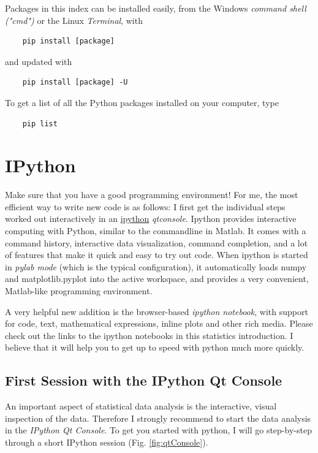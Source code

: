 Packages in this index can be installed easily, from the Windows \emph{command shell ("cmd")} or the Linux \emph{Terminal}, with

\begin{lstlisting}
    pip install [package]
\end{lstlisting}

and updated with

\begin{lstlisting}
    pip install [package] -U
\end{lstlisting}

To get a list of all the Python packages installed on your computer, type

\begin{lstlisting}
    pip list
\end{lstlisting}


\section{IPython}

Make sure that you have a good programming environment! For me, the most efficient way to write new code is as follows: I first get the individual steps worked out interactively in an \href{http://ipython.org/}{ipython} \emph{qtconsole}. Ipython provides interactive computing with Python, similar to the commandline in Matlab. It comes with a command history, interactive data visualization, command completion, and a lot of features that make it quick and easy to try out code. When ipython is started in \emph{pylab mode} (which is the typical configuration), it automatically loads numpy and matplotlib.pyplot into the active workspace, and provides a very convenient, Matlab-like programming environment.

A very helpful new addition is the browser-based \emph{ipython notebook}, with support for code, text, mathematical expressions, inline plots and other rich media. Please check out the links to the ipython
notebooks in this statistics introduction. I believe that it will  help you to get up to speed with python much more quickly.

\subsection{First Session with the IPython Qt Console}

An important aspect of statistical data analysis is the interactive, visual inspection of the data. Therefore I strongly recommend to start the data analysis in the \emph{IPython Qt Console}. To get you started with python, I will go step-by-step through a short IPython session (Fig. \ref{fig:qtConsole}).


